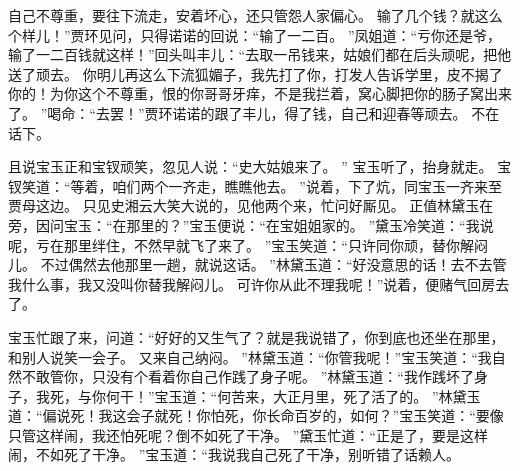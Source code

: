 自己不尊重，要往下流走，安着坏心，还只管怨人家偏心。
输了几个钱？就这么个样儿！”贾环见问，只得诺诺的回说：“输了一二百。
”凤姐道：“亏你还是爷，输了一二百钱就这样！”回头叫丰儿：“去取一吊钱来，姑娘们都在后头顽呢，把他送了顽去。
你明儿再这么下流狐媚子，我先打了你，打发人告诉学里，皮不揭了你的！为你这个不尊重，恨的你哥哥牙痒，不是我拦着，窝心脚把你的肠子窝出来了。
”喝命：“去罢！”贾环诺诺的跟了丰儿，得了钱，自己和迎春等顽去。
不在话下。
\par
且说宝玉正和宝钗顽笑，忽见人说：“史大姑娘来了。
”
宝玉听了，抬身就走。
宝钗笑道：“等着，咱们两个一齐走，瞧瞧他去。
”说着，下了炕，同宝玉一齐来至贾母这边。
只见史湘云大笑大说的，见他两个来，忙问好厮见。
正值林黛玉在旁，因问宝玉：“在那里的？”宝玉便说：“在宝姐姐家的。
”黛玉冷笑道：“我说呢，亏在那里绊住，不然早就飞了来了。
”宝玉笑道：“只许同你顽，替你解闷儿。
不过偶然去他那里一趟，就说这话。
”林黛玉道：“好没意思的话！去不去管我什么事，我又没叫你替我解闷儿。
可许你从此不理我呢！”说着，便赌气回房去了。
\par
宝玉忙跟了来，问道：“好好的又生气了？就是我说错了，你到底也还坐在那里，和别人说笑一会子。
又来自己纳闷。
”林黛玉道：“你管我呢！”宝玉笑道：“我自然不敢管你，只没有个看着你自己作践了身子呢。
”林黛玉道：“我作践坏了身子，我死，与你何干！”宝玉道：“何苦来，大正月里，死了活了的。
”林黛玉道：“偏说死！我这会子就死！你怕死，你长命百岁的，如何？”宝玉笑道：“要像只管这样闹，我还怕死呢？倒不如死了干净。
”黛玉忙道：“正是了，要是这样闹，不如死了干净。
”宝玉道：“我说我自己死了干净，别听错了话赖人。
